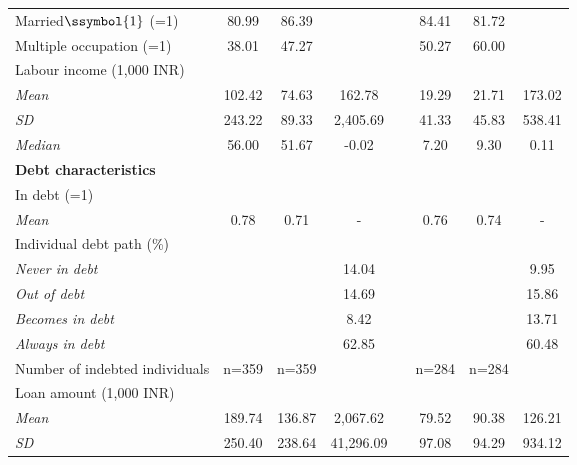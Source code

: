 \begin{table}[htbp]
{\begin{tabular}{lccccccc}
    Married$\ssymbol{1}$ (=1) & 80.99 & 86.39 &       &       & 84.41 & 81.72 &  \\
    Multiple occupation (=1) & 38.01 & 47.27 &       &       & 50.27 & 60.00 &  \\
    Labour income (1,000 INR) &       &       &       &       &       &       &  \\
    \hspace*{0.1cm} \textit{Mean} & 102.42 & 74.63 & 162.78 &       & 19.29 & 21.71 & 173.02 \\
    \hspace*{0.1cm} \textit{SD} & 243.22 & 89.33 & 2,405.69 &       & 41.33 & 45.83 & 538.41 \\
    \hspace*{0.1cm} \textit{Median} & 56.00 & 51.67 & -0.02 &       & 7.20  & 9.30  & 0.11 \\
    \textbf{Debt characteristics} &       &       &       &       &       &       &  \\
    In debt (=1) &       &       &       &       &       &       &  \\
    \hspace*{0.1cm} \textit{Mean} & 0.78  & 0.71  & -     &       & 0.76  & 0.74  & - \\
    Individual debt path (\%) &       &       &       &       &       &       &  \\
    \hspace*{0.1cm} \textit{Never in debt} &       &       & 14.04 &       &       &       & 9.95 \\
    \hspace*{0.1cm} \textit{Out of debt} &       &       & 14.69 &       &       &       & 15.86 \\
    \hspace*{0.1cm} \textit{Becomes in debt} &       &       & 8.42  &       &       &       & 13.71 \\
    \hspace*{0.1cm} \textit{Always in debt} &       &       & 62.85 &       &       &       & 60.48 \\
    Number of indebted individuals & n=359 & n=359 &       &       & n=284 & n=284 &  \\
    Loan amount (1,000 INR) &       &       &       &       &       &       &  \\
    \hspace*{0.1cm} \textit{Mean} & 189.74 & 136.87 & 2,067.62 &       & 79.52 & 90.38 & 126.21 \\
    \hspace*{0.1cm} \textit{SD} & 250.40 & 238.64 & 41,296.09 &       & 97.08 & 94.29 & 934.12 \\

\end{tabular}}
\end{table}
